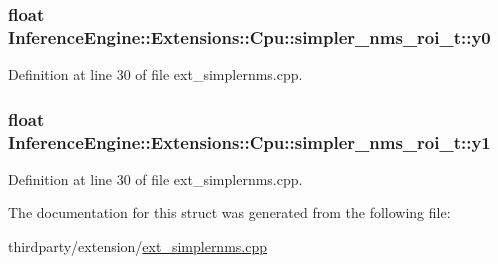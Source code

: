 \subsubsection[{\texorpdfstring{y0}{y0}}]{\setlength{\rightskip}{0pt plus 5cm}float Inference\+Engine\+::\+Extensions\+::\+Cpu\+::simpler\+\_\+nms\+\_\+roi\+\_\+t\+::y0}\hypertarget{structInferenceEngine_1_1Extensions_1_1Cpu_1_1simpler__nms__roi__t_a962e6b937c1b55bddccd90c799677522}{}\label{structInferenceEngine_1_1Extensions_1_1Cpu_1_1simpler__nms__roi__t_a962e6b937c1b55bddccd90c799677522}


Definition at line 30 of file ext\+\_\+simplernms.\+cpp.

\subsubsection[{\texorpdfstring{y1}{y1}}]{\setlength{\rightskip}{0pt plus 5cm}float Inference\+Engine\+::\+Extensions\+::\+Cpu\+::simpler\+\_\+nms\+\_\+roi\+\_\+t\+::y1}\hypertarget{structInferenceEngine_1_1Extensions_1_1Cpu_1_1simpler__nms__roi__t_a6eb511bcef14b77b8c37716ce7867f2a}{}\label{structInferenceEngine_1_1Extensions_1_1Cpu_1_1simpler__nms__roi__t_a6eb511bcef14b77b8c37716ce7867f2a}


Definition at line 30 of file ext\+\_\+simplernms.\+cpp.



The documentation for this struct was generated from the following file\+:\begin{DoxyCompactItemize}
\item 
thirdparty/extension/\hyperlink{ext__simplernms_8cpp}{ext\+\_\+simplernms.\+cpp}\end{DoxyCompactItemize}
